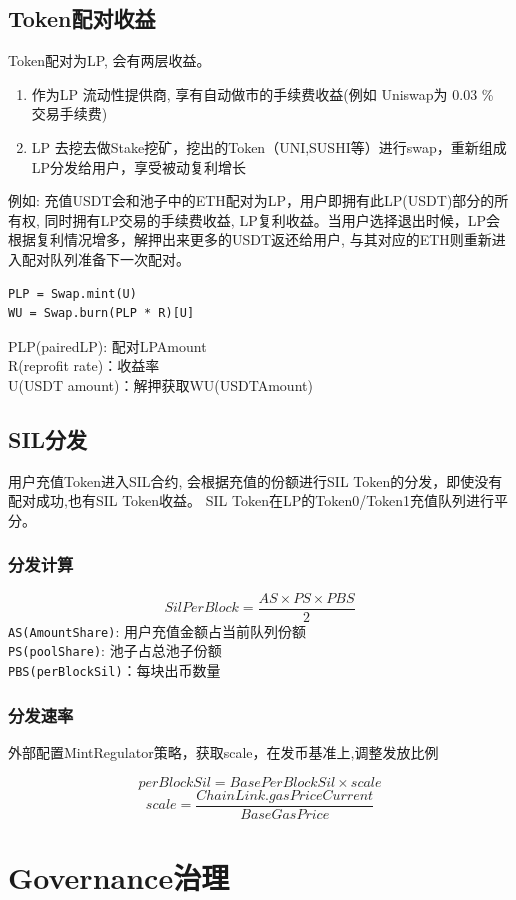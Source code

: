 \documentclass[11pt,letterpaper]{article}
\begin{document}
\begin{multicols}{2}
\subsection{Token配对收益}
Token配对为LP, 会有两层收益。
\begin{enumerate}
  \item 作为LP 流动性提供商, 享有自动做市的手续费收益(例如 Uniswap为 0.03 \% 交易手续费)
  \item LP 去挖去做Stake挖矿，挖出的Token（UNI,SUSHI等）进行swap，重新组成LP分发给用户，享受被动复利增长
\end{enumerate}
例如: 充值USDT会和池子中的ETH配对为LP，用户即拥有此LP(USDT)部分的所有权, 同时拥有LP交易的手续费收益, LP复利收益。当用户选择退出时候，LP会根据复利情况增多，解押出来更多的USDT返还给用户, 与其对应的ETH则重新进入配对队列准备下一次配对。
\begin{verbatim}
PLP = Swap.mint(U)
WU = Swap.burn(PLP * R)[U]
\end{verbatim}
PLP(pairedLP): 配对LPAmount\\
R(reprofit rate)：收益率\\
U(USDT amount)：解押获取WU(USDTAmount)

\subsection{SIL分发}
用户充值Token进入SIL合约, 会根据充值的份额进行SIL Token的分发，即使没有配对成功,也有SIL Token收益。 SIL Token在LP的Token0/Token1充值队列进行平分。

\subsubsection{分发计算}
\[ SilPerBlock = \frac{AS \times PS \times PBS}{2} \]
\texttt{AS(AmountShare)}: 用户充值金额占当前队列份额\\
\texttt{PS(poolShare)}: 池子占总池子份额\\
\texttt{PBS(perBlockSil)}：每块出币数量

\subsubsection{分发速率}
外部配置MintRegulator策略，获取scale，在发币基准上,调整发放比例

\[ perBlockSil =  BasePerBlockSil \times scale \]
\[ scale = \frac{ChainLink.gasPriceCurrent}{BaseGasPrice} \]

\section{Governance治理}

\end{multicols}
\end{document}

